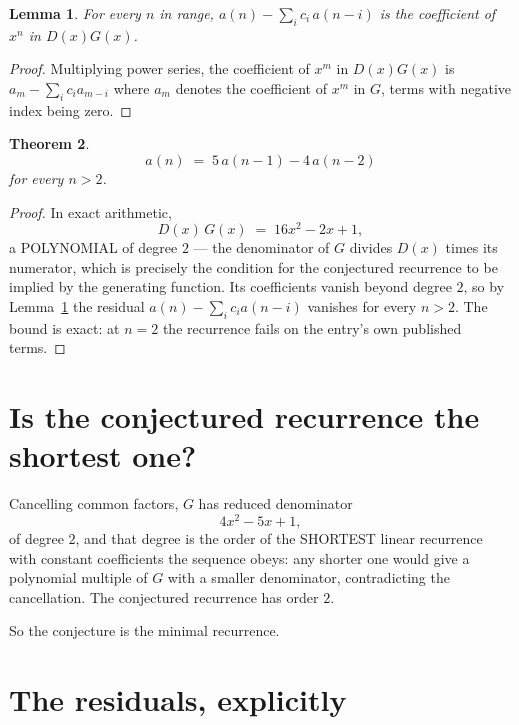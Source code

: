 \documentclass[11pt,a4paper]{article}
\theoremstyle{plain}
\newtheorem{theorem}{Theorem}
\newtheorem{lemma}[theorem]{Lemma}
\theoremstyle{definition}
\begin{document}
\begin{lemma}\label{lem:key}
For every $n$ in range, $a(n)-\sum_i c_i\,a(n-i)$ is the coefficient of $x^{n}$ in
$D(x)G(x)$.
\end{lemma}

\begin{proof}
Multiplying power series, the coefficient of $x^{m}$ in $D(x)G(x)$ is
$a_m-\sum_i c_i a_{m-i}$ where $a_m$ denotes the coefficient of $x^{m}$ in $G$, terms with
negative index being zero.
\end{proof}

\begin{theorem}
\[
a(n)\;=\;5\,a(n-1) - 4\,a(n-2)
\]
for every $n>2$.
\end{theorem}

\begin{proof}
In exact arithmetic,
\[
D(x)\,G(x)\;=\;16 x^{2} - 2 x + 1,
\]
a POLYNOMIAL of degree $2$ --- the denominator of $G$ divides $D(x)$ times its numerator,
which is precisely the condition for the conjectured recurrence to be implied by the
generating function. Its coefficients vanish beyond degree $2$, so by
Lemma~\ref{lem:key} the residual $a(n)-\sum_ic_ia(n-i)$ vanishes for every
$n>2$. The bound is exact: at $n=2$ the recurrence fails on the entry's own published terms.
\end{proof}

\section{Is the conjectured recurrence the shortest one?}

Cancelling common factors, $G$ has reduced denominator
\[
4 x^{2} - 5 x + 1,
\]
of degree $2$, and that degree is the order of the SHORTEST linear recurrence with
constant coefficients the sequence obeys: any shorter one would give a polynomial multiple of
$G$ with a smaller denominator, contradicting the cancellation. The conjectured recurrence has
order $2$.

So the conjecture is the minimal recurrence.

\section{The residuals, explicitly}
\end{document}
